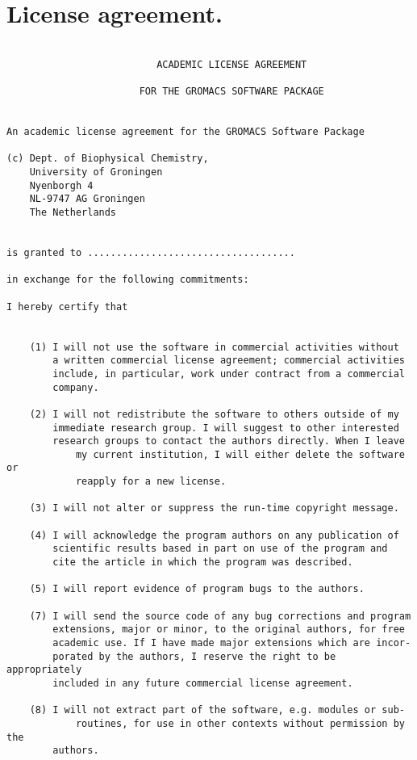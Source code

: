\chapter{License agreement.}
\label{ch:license}
\newpage

\begin{verbatim}

                          ACADEMIC LICENSE AGREEMENT

                       FOR THE GROMACS SOFTWARE PACKAGE


An academic license agreement for the GROMACS Software Package

(c) Dept. of Biophysical Chemistry, 
    University of Groningen
    Nyenborgh 4 
    NL-9747 AG Groningen
    The Netherlands


is granted to ....................................

in exchange for the following commitments:

I hereby certify that


	(1) I will not use the software in commercial activities without
	    a written commercial license agreement; commercial activities
	    include, in particular, work under contract from a commercial
	    company.

	(2) I will not redistribute the software to others outside of my
	    immediate research group. I will suggest to other interested
	    research groups to contact the authors directly. When I leave 
            my current institution, I will either delete the software or
            reapply for a new license.

	(3) I will not alter or suppress the run-time copyright message.

	(4) I will acknowledge the program authors on any publication of
	    scientific results based in part on use of the program and 
	    cite the article in which the program was described.

	(5) I will report evidence of program bugs to the authors.

	(7) I will send the source code of any bug corrections and program
	    extensions, major or minor, to the original authors, for free
	    academic use. If I have made major extensions which are incor-
	    porated by the authors, I reserve the right to be appropriately
	    included in any future commercial license agreement.

	(8) I will not extract part of the software, e.g. modules or sub-
            routines, for use in other contexts without permission by the
	    authors.


\end{verbatim}
